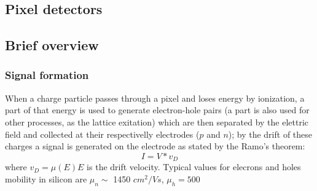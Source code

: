 \label{chip}
\begin{titlepage}

\section{Pixel detectors}

\subsection{Brief overview}
\subsubsection{Signal formation}
When a charge particle passes through a pixel and loses energy by ionization, a part of that
energy is used to generate electron-hole pairs (a part is also used for other processes, as the lattice 
exitation) which are then separated by the elettric field 
and collected at their respectivelly electrodes ($p$ and $n$); by the drift of these charges a 
signal is generated on the electrode as stated by the Ramo's theorem: 
\begin{equation}
   I = V * v_{D}
\end{equation}
where $v_{D} = \mu(E)E$ is the drift velocity. Typical values for elecrons and holes mobility 
in silicon are $\mu _n \sim$ 1450 $cm^2/Vs$, $\mu _h = 500$\\


\end{titlepage}
